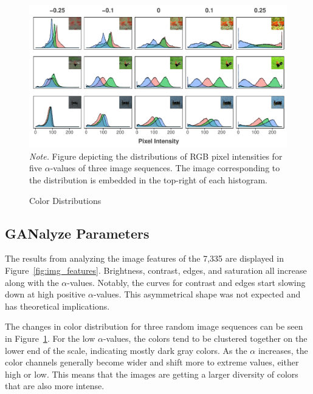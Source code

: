 \documentclass[../main.tex]{subfiles}
\begin{document}
\begin{figure}[!t]
	\caption{Color Distributions}
	\label{fig:col_dists}
	\includegraphics[width=1\linewidth]{images/results/col_dists_edit.pdf}
	{\textit{Note.} Figure depicting the distributions of RGB pixel intensities for five $\alpha$-values of three image sequences. The image corresponding to the distribution is embedded in the top-right of each histogram.}
\end{figure}

\subsection{GANalyze Parameters}
The results from analyzing the image features of the 7,335 are displayed in Figure~\ref{fig:img_features}. Brightness, contrast, edges, and saturation all increase along with the $\alpha$-values. Notably, the curves for contrast and edges start slowing down at high positive $\alpha$-values. This asymmetrical shape was not expected and has theoretical implications.

The changes in color distribution for three random image sequences can be seen in Figure~\ref{fig:col_dists}. For the low $\alpha$-values, the colors tend to be clustered together on the lower end of the scale, indicating mostly dark gray colors. As the $\alpha$ increases, the color channels generally become wider and shift more to extreme values, either high or low. This means that the images are getting a larger diversity of colors that are also more intense.
\end{document}
